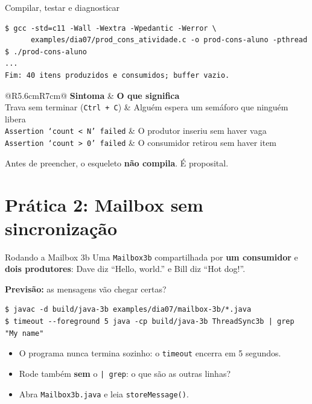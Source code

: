\documentclass[aspectratio=169]{beamer}
\begin{document}
\begin{frame}[fragile]{Compilar, testar e diagnosticar}
\begin{lstlisting}[style=terminal, basicstyle=\ttfamily\scriptsize\color{termfg}]
$ gcc -std=c11 -Wall -Wextra -Wpedantic -Werror \
      examples/dia07/prod_cons_atividade.c -o prod-cons-aluno -pthread
$ ./prod-cons-aluno
...
Fim: 40 itens produzidos e consumidos; buffer vazio.
\end{lstlisting}

\begin{center}
\small
\begin{tabular}{@{}R{5.6cm}R{7cm}@{}}
\toprule
\textbf{Sintoma} & \textbf{O que significa} \\
\midrule
Trava sem terminar (\texttt{Ctrl + C}) & Alguém espera um semáforo que ninguém libera \\
\texttt{Assertion `count < N' failed} & O produtor inseriu sem haver vaga \\
\texttt{Assertion `count > 0' failed} & O consumidor retirou sem haver item \\
\bottomrule
\end{tabular}
\end{center}

\small Antes de preencher, o esqueleto \textbf{não compila}. É proposital.
\end{frame}

\section{Prática 2: Mailbox sem sincronização}

\begin{frame}[fragile]{Rodando a Mailbox 3b}
\small Uma \texttt{Mailbox3b} compartilhada por \textbf{um consumidor} e \textbf{dois produtores}: Dave diz ``Hello, world.'' e Bill diz ``Hot dog!''.

\textbf{Previsão:} as mensagens vão chegar certas?

\begin{lstlisting}[style=terminal, basicstyle=\ttfamily\scriptsize\color{termfg}]
$ javac -d build/java-3b examples/dia07/mailbox-3b/*.java
$ timeout --foreground 5 java -cp build/java-3b ThreadSync3b | grep "My name"
\end{lstlisting}

\begin{itemize}\small
    \item O programa nunca termina sozinho: o \texttt{timeout} encerra em 5 segundos.
    \item Rode também \textbf{sem} o \texttt{| grep}: o que são as outras linhas?
    \item Abra \texttt{Mailbox3b.java} e leia \texttt{storeMessage()}.
\end{itemize}
\end{frame}
\end{document}
